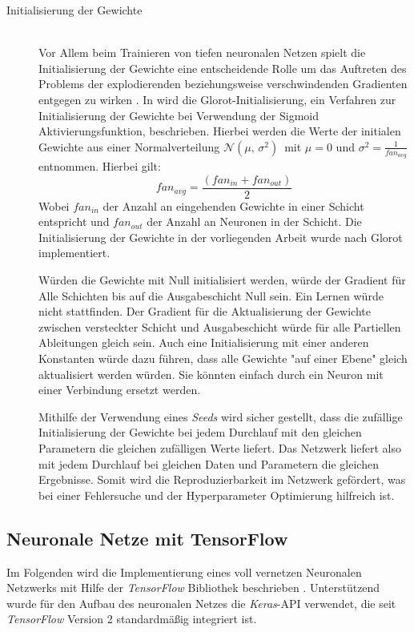 \begin{description}
	\item[Initialisierung der Gewichte]\hfill \\
	Vor Allem beim Trainieren von tiefen neuronalen Netzen spielt die Initialisierung der Gewichte eine entscheidende Rolle um das Auftreten des Problems der explodierenden beziehungsweise verschwindenden Gradienten entgegen zu wirken \cite{geron2017hands-on}. In \cite{Glorot10understandingthe} wird die Glorot-Initialisierung, ein Verfahren zur Initialisierung der Gewichte bei Verwendung der Sigmoid Aktivierungsfunktion, beschrieben. Hierbei werden die Werte der initialen Gewichte aus einer Normalverteilung $\mathcal{N}(\mu,\,\sigma^{2})\,$ mit $\mu = 0$ und $\sigma^{2}=\frac{1}{fan_{avg}}$ entnommen. Hierbei gilt: 
	\[
	fan_{avg}=\frac{(fan_{in}+fan_{out})}{2}
	\]
	Wobei $fan_{in}$ der Anzahl an eingehenden Gewichte in einer Schicht entspricht und  $fan_{out}$ der Anzahl an Neuronen in der Schicht. Die Initialisierung der Gewichte in der vorliegenden Arbeit wurde  nach Glorot implementiert.

	Würden die Gewichte mit Null initialisiert werden, würde der Gradient für Alle Schichten bis auf die Ausgabeschicht Null sein. Ein Lernen würde nicht stattfinden. Der Gradient für die Aktualisierung der Gewichte zwischen versteckter Schicht und Ausgabeschicht würde für alle Partiellen Ableitungen gleich sein. Auch eine Initialisierung mit einer anderen Konstanten würde dazu führen, dass alle Gewichte "auf einer Ebene" gleich aktualisiert werden würden. Sie könnten einfach durch ein Neuron mit einer Verbindung ersetzt werden.
	
	Mithilfe der Verwendung eines \emph{Seeds} wird sicher gestellt, dass die zufällige Initialisierung der Gewichte bei jedem Durchlauf mit den gleichen Parametern die gleichen zufälligen Werte liefert. Das Netzwerk liefert also mit jedem Durchlauf bei gleichen Daten und Parametern die gleichen Ergebnisse. Somit wird die Reproduzierbarkeit im Netzwerk gefördert, was bei einer Fehlersuche und der Hyperparameter Optimierung hilfreich ist.
	
\end{description}
\subsection{Neuronale Netze mit TensorFlow}
Im Folgenden wird die Implementierung eines voll vernetzen Neuronalen Netzwerks mit Hilfe der \emph{TensorFlow} Bibliothek beschrieben \cite{tensorflow2015-whitepaper}. Unterstützend wurde für den Aufbau des neuronalen Netzes die \emph{Keras}-API verwendet, die seit \emph{TensorFlow} Version 2 standardmäßig integriert ist. 

